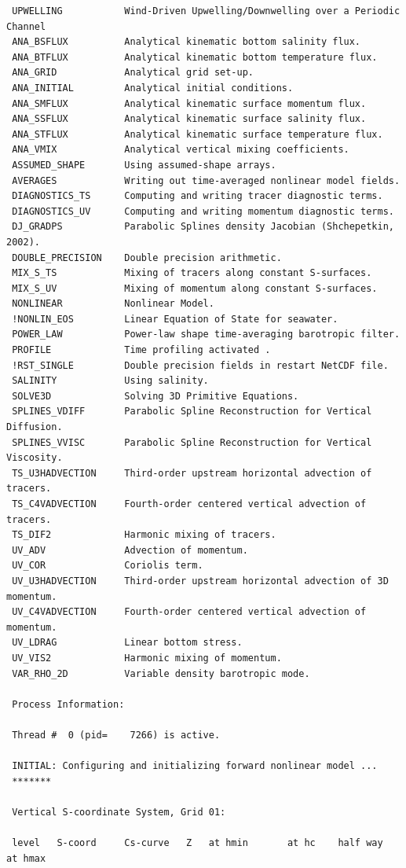 \begin{verbatim}
 UPWELLING           Wind-Driven Upwelling/Downwelling over a Periodic Channel
 ANA_BSFLUX          Analytical kinematic bottom salinity flux.
 ANA_BTFLUX          Analytical kinematic bottom temperature flux.
 ANA_GRID            Analytical grid set-up.
 ANA_INITIAL         Analytical initial conditions.
 ANA_SMFLUX          Analytical kinematic surface momentum flux.
 ANA_SSFLUX          Analytical kinematic surface salinity flux.
 ANA_STFLUX          Analytical kinematic surface temperature flux.
 ANA_VMIX            Analytical vertical mixing coefficients.
 ASSUMED_SHAPE       Using assumed-shape arrays.
 AVERAGES            Writing out time-averaged nonlinear model fields.
 DIAGNOSTICS_TS      Computing and writing tracer diagnostic terms.
 DIAGNOSTICS_UV      Computing and writing momentum diagnostic terms.
 DJ_GRADPS           Parabolic Splines density Jacobian (Shchepetkin, 2002).
 DOUBLE_PRECISION    Double precision arithmetic.
 MIX_S_TS            Mixing of tracers along constant S-surfaces.
 MIX_S_UV            Mixing of momentum along constant S-surfaces.
 NONLINEAR           Nonlinear Model.
 !NONLIN_EOS         Linear Equation of State for seawater.
 POWER_LAW           Power-law shape time-averaging barotropic filter.
 PROFILE             Time profiling activated .
 !RST_SINGLE         Double precision fields in restart NetCDF file.
 SALINITY            Using salinity.
 SOLVE3D             Solving 3D Primitive Equations.
 SPLINES_VDIFF       Parabolic Spline Reconstruction for Vertical Diffusion.
 SPLINES_VVISC       Parabolic Spline Reconstruction for Vertical Viscosity.
 TS_U3HADVECTION     Third-order upstream horizontal advection of tracers.
 TS_C4VADVECTION     Fourth-order centered vertical advection of tracers.
 TS_DIF2             Harmonic mixing of tracers.
 UV_ADV              Advection of momentum.
 UV_COR              Coriolis term.
 UV_U3HADVECTION     Third-order upstream horizontal advection of 3D momentum.
 UV_C4VADVECTION     Fourth-order centered vertical advection of momentum.
 UV_LDRAG            Linear bottom stress.
 UV_VIS2             Harmonic mixing of momentum.
 VAR_RHO_2D          Variable density barotropic mode.

 Process Information:

 Thread #  0 (pid=    7266) is active.

 INITIAL: Configuring and initializing forward nonlinear model ...
 *******

 Vertical S-coordinate System, Grid 01:

 level   S-coord     Cs-curve   Z   at hmin       at hc    half way     at hmax


\end{verbatim}
